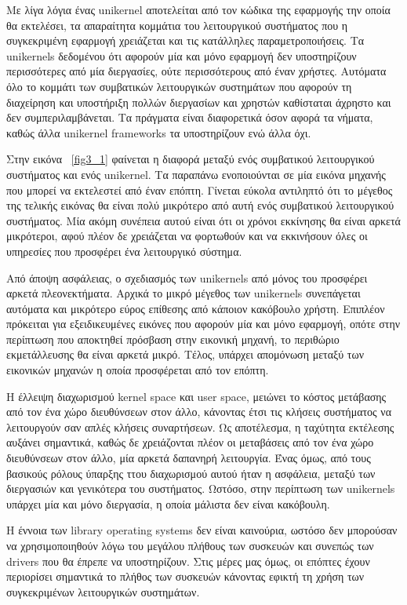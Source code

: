 Με λίγα λόγια ένας unikernel αποτελείται από τον κώδικα της εφαρμογής την οποία
θα εκτελέσει, τα απαραίτητα κομμάτια του λειτουργικού συστήματος που η
συγκεκριμένη εφαρμογή χρειάζεται και τις κατάλληλες παραμετροποιήσεις. Τα
unikernels δεδομένου ότι αφορούν μία και μόνο εφαρμογή δεν υποστηρίζουν
περισσότερες από μία διεργασίες, ούτε περισσότερους από έναν χρήστες. Αυτόματα
όλο το κομμάτι των συμβατικών λειτουργικών συστημάτων που αφορούν τη διαχείρηση
και υποστήριξη πολλών διεργασίων και χρηστών καθίσταται άχρηστο και δεν
συμπεριλαμβάνεται. Τα πράγματα είναι διαφορετικά όσον αφορά τα νήματα, καθώς
άλλα unikernel frameworks τα υποστηρίζουν ενώ άλλα όχι. 

Στην εικόνα ~\ref{fig3_1} φαίνεται η διαφορά μεταξύ ενός συμβατικού λειτουργικού
συστήματος και ενός unikernel. Τα παραπάνω ενοποιούνται σε μία εικόνα μηχανής
που μπορεί να εκτελεστεί από έναν επόπτη. Γίνεται εύκολα αντιληπτό ότι το
μέγεθος της τελικής εικόνας θα είναι πολύ μικρότερο από αυτή ενός συμβατικού
λειτουργικού συστήματος. Μία ακόμη συνέπεια αυτού είναι ότι οι χρόνοι εκκίνησης
θα είναι αρκετά μικρότεροι, αφού πλέον δε χρειάζεται να φορτωθούν και να
εκκινήσουν όλες οι υπηρεσίες που προσφέρει ένα λειτουργικό σύστημα. 

Από άποψη ασφάλειας, ο σχεδιασμός των unikernels από μόνος του προσφέρει
αρκετά πλεονεκτήματα. Αρχικά το μικρό μέγεθος των unikernels συνεπάγεται αυτόματα
και μικρότερο εύρος επίθεσης από κάποιον κακόβουλο χρήστη. Επιπλέον πρόκειται
για εξειδικευμένες εικόνες που αφορούν μία και μόνο εφαρμογή, οπότε στην
περίπτωση που αποκτηθεί πρόσβαση στην εικονική μηχανή, το περιθώριο
εκμετάλλευσης θα είναι αρκετά μικρό. Τέλος, υπάρχει απομόνωση μεταξύ των
εικονικών μηχανών η οποία προσφέρεται από τον επόπτη. 

H έλλειψη διαχωρισμού kernel space και user space, μειώνει το κόστος
μετάβασης από τον ένα χώρο διευθύνσεων στον άλλο, κάνοντας έτσι τις κλήσεις
συστήματος να λειτουργούν σαν απλές κλήσεις συναρτήσεων. Ως αποτέλεσμα, η
ταχύτητα εκτέλεσης αυξάνει σημαντικά, καθώς δε χρειάζονται πλέον οι μεταβάσεις
από τον ένα χώρο διευθύνσεων στον άλλο, μία αρκετά δαπανηρή λειτουργία. Ένας
όμως, από τους βασικούς ρόλους ύπαρξης ττου διαχωρισμού αυτού ήταν η ασφάλεια,
μεταξύ των διεργασιών και γενικότερα του συστήματος. Ωστόσο, στην περίπτωση των
unikernels υπάρχει μία και μόνο διεργασία, η οποία μάλιστα δεν είναι κακόβουλη.

Η έννοια των library operating systems δεν είναι καινούρια, ωστόσο δεν μπορούσαν
να χρησιμοποιηθούν λόγω του μεγάλου πλήθους των συσκευών και συνεπώς των drivers
που θα έπρεπε να υποστηρίζουν. Στις μέρες μας όμως, οι επόπτες έχουν περιορίσει
σημαντικά το πλήθος των συσκευών κάνοντας εφικτή τη χρήση των συγκεκριμένων
λειτουργικών συστημάτων. 
 

